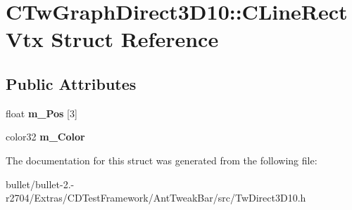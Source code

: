 \hypertarget{struct_c_tw_graph_direct3_d10_1_1_c_line_rect_vtx}{\section{C\+Tw\+Graph\+Direct3\+D10\+:\+:C\+Line\+Rect\+Vtx Struct Reference}
\label{struct_c_tw_graph_direct3_d10_1_1_c_line_rect_vtx}
}
\subsection*{Public Attributes}
\begin{DoxyCompactItemize}
\item 
\hypertarget{struct_c_tw_graph_direct3_d10_1_1_c_line_rect_vtx_acd6dcb89e008ea04a98eade889796f34}{float {\bfseries m\+\_\+\+Pos} \mbox{[}3\mbox{]}}\label{struct_c_tw_graph_direct3_d10_1_1_c_line_rect_vtx_acd6dcb89e008ea04a98eade889796f34}

\item 
\hypertarget{struct_c_tw_graph_direct3_d10_1_1_c_line_rect_vtx_a6393ad6bdb807071a29f5e018be9ba83}{color32 {\bfseries m\+\_\+\+Color}}\label{struct_c_tw_graph_direct3_d10_1_1_c_line_rect_vtx_a6393ad6bdb807071a29f5e018be9ba83}

\end{DoxyCompactItemize}


The documentation for this struct was generated from the following file\+:\begin{DoxyCompactItemize}
\item 
bullet/bullet-\/2.-\/r2704/\+Extras/\+C\+D\+Test\+Framework/\+Ant\+Tweak\+Bar/src/Tw\+Direct3\+D10.\+h\end{DoxyCompactItemize}
